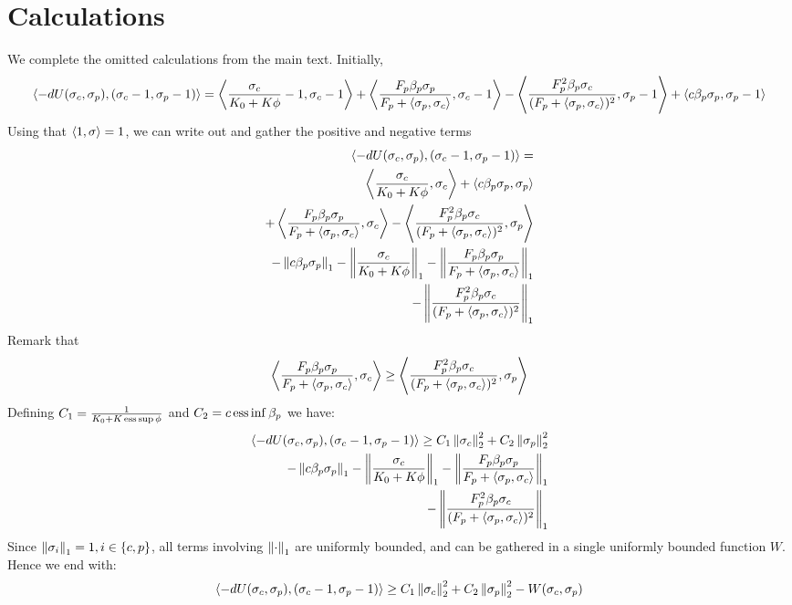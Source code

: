 \section{Calculations}
\label{appendix:calculations}
We complete the omitted calculations from the main text. Initially,
\begin{equation}
  \label{eq:calc_app}
  \ip{-dU(\sigma_c,\sigma_p)}{(\sigma_c-1, \sigma_p-1)} = \ip{\frac{\sigma_c}{K_0 + K\phi} - 1}{\sigma_c
  - 1} + \ip{\frac{F_p\beta_p\sigma_p}{F_p + \ip{\sigma_p}{\sigma_c}}}{\sigma_c-1}
  - \ip{\frac{F_p^2\beta_p\sigma_c}{(F_p + \ip{\sigma_p}{\sigma_c})^2}}{\sigma_p - 1} + \ip{c \beta_p \sigma_p}{\sigma_p -1}
\end{equation}
Using that $\left \langle 1,\sigma \right \rangle = 1$, we can write out  and gather the positive and negative terms
\begin{equation}
  \begin{split}
  \ip{-dU(\sigma_c,\sigma_p)}{(\sigma_c-1, \sigma_p-1)} = \\
  \ip{\frac{\sigma_c}{K_0 + K\phi}}{\sigma_c} + \ip{c \beta_p \sigma_p}{\sigma_p} \\ + \ip{\frac{F_p\beta_p\sigma_p}{F_p + \ip{\sigma_p}{\sigma_c}}}{\sigma_c} - \ip{\frac{F_p^2\beta_p\sigma_c}{(F_p + \ip{\sigma_p}{\sigma_c})^2}}{\sigma_p} \\
  - \norm{c\beta_p \sigma_p}_1 - \norm{\frac{\sigma_c}{K_0 + K\phi}}_1 - \norm{\frac{F_p\beta_p\sigma_p}{F_p + \ip{\sigma_p}{\sigma_c}}}_1 \\
   - \norm{\frac{F_p^2\beta_p\sigma_c}{(F_p + \ip{\sigma_p}{\sigma_c})^2}}_1
\end{split}
\end{equation}
Remark that
\begin{equation}
  \left \langle \frac{F_p\beta_p\sigma_p}{F_p + \left \langle \sigma_p,\sigma_c \right \rangle},\sigma_c \right \rangle \geq \left \langle \frac{F_p^2\beta_p\sigma_c}{(F_p + \left \langle \sigma_p,\sigma_c \right \rangle)^2},\sigma_p \right \rangle
\end{equation}
Defining $C_1 = \frac{1}{K_0 + K \ess \sup \phi}$ and $C_2 = c \operatorname{ess} \inf \beta_p$ we have:
\begin{equation}
  \begin{split}
  \ip{-dU(\sigma_c,\sigma_p)}{(\sigma_c-1, \sigma_p-1)} \geq C_1 \norm{\sigma_c}^2_2 + C_2 \norm{\sigma_p}_2^2 \\
  - \norm{c\beta_p \sigma_p}_1 - \norm{\frac{\sigma_c}{K_0 + K\phi}}_1 - \norm{\frac{F_p\beta_p\sigma_p}{F_p + \ip{\sigma_p}{\sigma_c}}}_1 \\
   - \norm{\frac{F_p^2\beta_p\sigma_c}{(F_p + \ip{\sigma_p}{\sigma_c})^2}}_1
  \end{split}
\end{equation}
Since $\left \Vert \sigma_i \right \Vert_1=1, i \in \{c,p\}$, all terms involving $\left \Vert \cdot \right \Vert_1$ are uniformly bounded, and can be gathered in a single uniformly bounded function $W$. Hence we end with:
\begin{equation}
    \left \langle -dU(\sigma_c,\sigma_p),(\sigma_c-1, \sigma_p-1) \right \rangle \geq C_1 \left \Vert \sigma_c \right \Vert_2^2 + C_2 \left \Vert \sigma_p \right \Vert_2^2 - W(\sigma_c,\sigma_p)
\end{equation}
